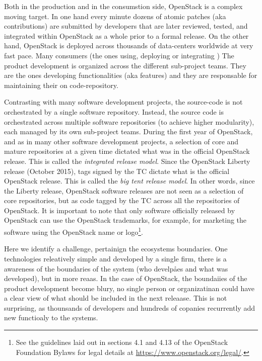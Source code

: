 \documentclass[dvipsnames]{interact}
\theoremstyle{plain}\newtheorem{theorem}{Theorem}[section]
\theoremstyle{definition}
\theoremstyle{remark}
\newenvironment{newStuff}{
    \begin{color}{Sepia}
    \begin{tabular}{|p{1.0\textwidth}|}
    \hline\\
    }
    { 
    \\\\\hline
    \end{tabular} 
    \end{color}
    }
\renewenvironment{newStuff}{}{}
\begin{document}
\begin{newStuff}

Both in the production and in the consumstion side, OpenStack is a complex moving target. In one hand every minute dozens of atomic patches (aka contributions) are submitted by developers that are later reviewed, tested, and integrated within OpenStack as a whole prior to a formal release. On the other hand, OpenStack is deployed across thousands of data-centers worldwide at very fast pace. Many consumers (the ones using, deploying or integrating ) 
The product development is organized across the different  sub-project teams. They are the ones developing functionalities (aka features) and they are responsable for maintaining their on code-repository. 

Contrasting with many software development projects, the source-code is not orchestrated by a single software repository. Instead, the source code is orchestrated across multiple software repositories (to achieve higher modularity), each managed by its own sub-project teams. During the first year of OpenStack, and as in many other software development projects,   a selection of core and mature repositories at a given time dictated what was in the official OpenStack release. This is called the \textit{integrated release model}. Since the OpenStack Liberty release (October 2015), tags signed by the  \ac{TC}  dictate what is the official OpenStack release. This is called the \textit{big tent release model}. In other words, since the Liberty release, OpenStack software releases are not seen as a selection of core repositories, but as code tagged by the  \ac{TC} across all the repositories of OpenStack. It is important to note that only software officially released by OpenStack can use the OpenStack trademarks, for example, for marketing the software using the OpenStack name or logo\footnote{See the guidelines laid out in sections 4.1 and 4.13 of the OpenStack Foundation Bylaws for legal details at \url{https://www.openstack.org/legal/}.}.  

Here we identify a challenge, pertainign the ecosystems boundaries. One technologies releatively simple and developed by a single firm, there is a awareness of the boundaries of the system (who develpåes and what was developed), but in more reaas. In the case of OpenStack, the boundaiies of the product development become blury, no single person or organizatinan could have a clear view of what should be included in the next releaase. This is not surprising, as thounsands of developers and hundreds of copanies recurrently add new functioaly to the systems.  


\end{newStuff}
\end{document}
